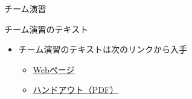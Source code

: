 \documentclass[a4paper,twoside,twocolumn]{beamer}
\begin{document}
\begin{frame}[label=sec-4]{チーム演習}
\begin{block}{チーム演習のテキスト}
\begin{itemize}
\item チーム演習のテキストは次のリンクから入手
\begin{itemize}
\item \href{https://github.com/ychubachi/github_practice/blob/master/github_practice-team_handout.org}{Webページ}
\item \href{https://github.com/ychubachi/github_practice/raw/master/github_practice-team_handout.pdf}{ハンドアウト（PDF）}
\end{itemize}
\end{itemize}
\end{block}
\end{frame}
\end{document}

